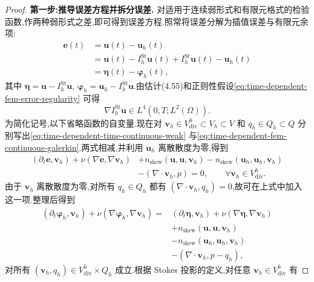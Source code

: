 \begin{theorem}
\begin{proof}
\textbf{第一步:推导误差方程并拆分误差.}
对适用于连续弱形式和有限元格式的检验函数,作两种弱形式之差,即可得到误差方程.照常将误差分解为插值误差与有限元余项:
\begin{equation}\label{eq:time-dependent-fem-error-splitting}
\begin{aligned}
  \bm{e}(t)
  &=\bm{u}(t)-\bm{u}_h(t)\\
  &=\bm{u}(t)-I_h^{\mathrm{St}}\bm{u}(t)
      +I_h^{\mathrm{St}}\bm{u}(t)-\bm{u}_h(t)\\
  &=\symbf{\eta}(t)-\symbf{\varphi}_h(t),
\end{aligned}
\end{equation}
其中 $\symbf{\eta}=\bm{u}-I_h^{\mathrm{St}}\bm{u}$,
$\symbf{\varphi}_h=\bm{u}_h-I_h^{\mathrm{St}}\bm{u}$.由估计(4.55)和正则性假设\cref{eq:time-dependent-fem-error-regularity} 可得
\begin{equation}\label{eq:time-dependent-fem-stokes-gradient-regularity}
  \nabla I_h^{\mathrm{St}}\bm{u}
    \in L^4(0,T;L^2(\Omega)).
\end{equation}
为简化记号,以下省略函数的自变量.现在对
$\bm{v}_h\in V_{\mathrm{div}}^h\subset V_h\subset V$ 和
$q_h\in Q_h\subset Q$ 分别写出\cref{eq:time-dependent-time-continuous-weak} 与\cref{eq:time-dependent-fem-continuous-galerkin}.两式相减,并利用 $\bm{u}_h$ 离散散度为零,得到
\[
\begin{aligned}
  (\partial_t\bm{e},\bm{v}_h)
    +\nu(\nabla\bm{e},\nabla\bm{v}_h)
    &+n_{\mathrm{skew}}(\bm{u},\bm{u},\bm{v}_h)
      -n_{\mathrm{skew}}(\bm{u}_h,\bm{u}_h,\bm{v}_h)\\
    &-(\nabla\cdot\bm{v}_h,p)=0,
      \qquad \forall\bm{v}_h\in V_{\mathrm{div}}^h.
\end{aligned}
\]
由于 $\bm{v}_h$ 离散散度为零,对所有 $q_h\in Q_h$ 都有
$(\nabla\cdot\bm{v}_h,q_h)=0$,故可在上式中加入这一项.整理后得到
\begin{equation}\label{eq:time-dependent-fem-error-equation}
\begin{aligned}
  (\partial_t\symbf{\varphi}_h,\bm{v}_h)
    +\nu(\nabla\symbf{\varphi}_h,\nabla\bm{v}_h)
  ={}&(\partial_t\symbf{\eta},\bm{v}_h)
    +\nu(\nabla\symbf{\eta},\nabla\bm{v}_h)\\
   &+n_{\mathrm{skew}}(\bm{u},\bm{u},\bm{v}_h)\\
   &-n_{\mathrm{skew}}(\bm{u}_h,\bm{u}_h,\bm{v}_h)\\
   &-(\nabla\cdot\bm{v}_h,p-q_h),
\end{aligned}
\end{equation}
对所有 $(\bm{v}_h,q_h)\in V_{\mathrm{div}}^h\times Q_h$ 成立.根据 Stokes 投影的定义,对任意 $\bm{v}_h\in V_{\mathrm{div}}^h$ 有

\end{proof}
\end{theorem}
